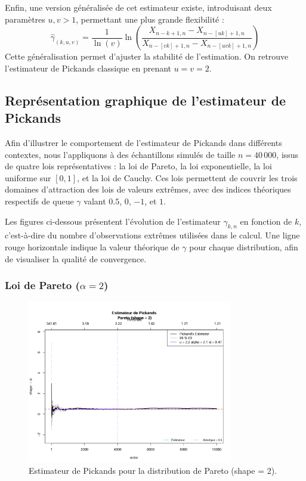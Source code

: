 \documentclass{article}
\theoremstyle{plain}
\theoremstyle{definition}
\theoremstyle{plain}
\begin{document}
\medskip
Enfin, une version généralisée de cet estimateur existe, introduisant deux paramètres \(u, v > 1\), permettant une plus grande flexibilité :
\[
\hat{\gamma}_{(k,u,v)} = \frac{1}{\ln(v)} \ln\left( \frac{X_{n-k+1,n} - X_{n-[uk]+1,n}}{X_{n-[vk]+1,n} - X_{n-[uvk]+1,n}} \right)
\]
Cette généralisation permet d'ajuster la stabilité de l'estimation. On retrouve l'estimateur de Pickands classique en prenant \(u = v = 2\).

\subsection{Représentation graphique de l’estimateur de Pickands}

Afin d'illustrer le comportement de l’estimateur de Pickands dans différents contextes, nous l'appliquons à des échantillons simulés de taille \(n = 40\,000\), issus de quatre lois représentatives : la loi de Pareto, la loi exponentielle, la loi uniforme sur \([0,1]\), et la loi de Cauchy. Ces lois permettent de couvrir les trois domaines d’attraction des lois de valeurs extrêmes, avec des indices théoriques respectifs de queue \(\gamma\) valant \(0.5\), \(0\), \(-1\), et \(1\).

Les figures ci-dessous présentent l’évolution de l’estimateur \(\hat{\gamma}_{k,n}\) en fonction de \(k\), c’est-à-dire du nombre d’observations extrêmes utilisées dans le calcul. Une ligne rouge horizontale indique la valeur théorique de \(\gamma\) pour chaque distribution, afin de visualiser la qualité de convergence.

\subsubsection{Loi de Pareto (\(\alpha = 2\))}

\begin{figure}[H]
    \centering
    \includegraphics[width=0.8\textwidth]{./images/pareto.png}
    \caption{Estimateur de Pickands pour la distribution de Pareto (shape = 2).}
    \label{fig:pickands_pareto}
\end{figure}
\end{document}
